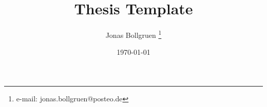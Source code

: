 \documentclass[a4paper,cleardoubleempty,BCOR1cm]{scrbook}
\title{Thesis Template}
\author{Jonas Bollgruen \thanks{e-mail: jonas.bollgruen@posteo.de}}
\date{\today}
\begin{document}
%



\appendix

%
%
\nocite{*}

\end{document}
